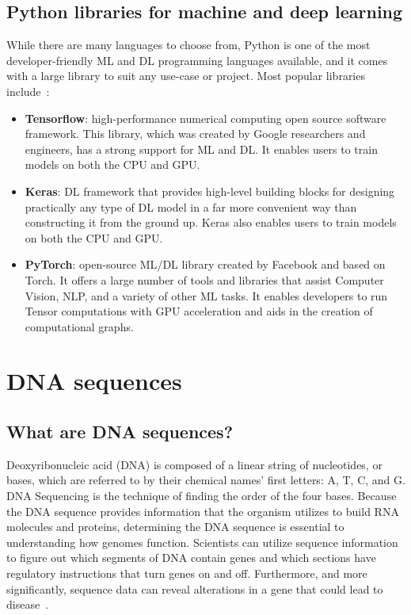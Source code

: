 \subsection{Python libraries for machine and deep learning}

While there are many languages to choose from, Python is one of the most developer-friendly \gls{ML} and \gls{DL} programming languages available, and it comes with a large library to suit any use-case or project. Most popular libraries include~\cite{JonssonWaysDevelopment,BestGeeksforGeeks}:

\begin{itemize}
    \item \textbf{Tensorflow}: high-performance numerical computing open source software framework. This library, which was created by Google researchers and engineers, has a strong support for \gls{ML} and \gls{DL}.  It enables users to train models on both the CPU and GPU.
    \item \textbf{Keras}: \gls{DL} framework that provides high-level building blocks for designing practically any type of \gls{DL} model in a far more convenient way than constructing it from the ground up. Keras also enables users to train models on both the CPU and GPU.
    \item \textbf{PyTorch}: open-source \gls{ML}/\gls{DL} library created by Facebook and based on Torch. It offers a large number of tools and libraries that assist Computer Vision, \gls{NLP}, and a variety of other \gls{ML} tasks. It enables developers to run Tensor computations with GPU acceleration and aids in the creation of computational graphs.
\end{itemize}

\section{DNA sequences} \label{sec:dna_sequences}

\subsection{What are DNA sequences?}

Deoxyribonucleic acid (DNA) is composed of a linear string of nucleotides, or bases, which are referred to by their chemical names' first letters: A, T, C, and G. DNA Sequencing is the technique of finding the order of the four bases. Because the DNA sequence provides information that the organism utilizes to build RNA molecules and proteins, determining the DNA sequence is essential to understanding how genomes function. Scientists can utilize sequence information to figure out which segments of DNA contain genes and which sections have regulatory instructions that turn genes on and off. Furthermore, and more significantly, sequence data can reveal alterations in a gene that could lead to disease~\cite{2020DNASheet}.

